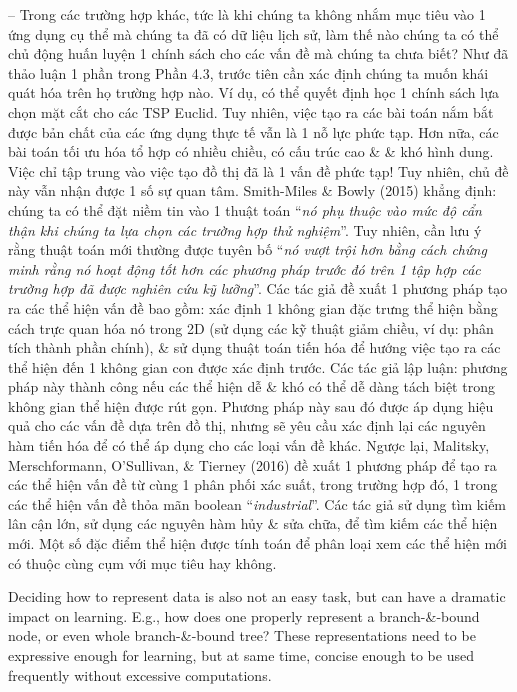 \documentclass{article}
\begin{document}
\begin{itemize}
\begin{itemize}
        -- Trong các trường hợp khác, tức là khi chúng ta không nhắm mục tiêu vào 1 ứng dụng cụ thể mà chúng ta đã có dữ liệu lịch sử, làm thế nào chúng ta có thể chủ động huấn luyện 1 chính sách cho các vấn đề mà chúng ta chưa biết? Như đã thảo luận 1 phần trong Phần 4.3, trước tiên cần xác định chúng ta muốn khái quát hóa trên họ trường hợp nào. Ví dụ, có thể quyết định học 1 chính sách lựa chọn mặt cắt cho các TSP Euclid. Tuy nhiên, việc tạo ra các bài toán nắm bắt được bản chất của các ứng dụng thực tế vẫn là 1 nỗ lực phức tạp. Hơn nữa, các bài toán tối ưu hóa tổ hợp có nhiều chiều, có cấu trúc cao \& \& khó hình dung. Việc chỉ tập trung vào việc tạo đồ thị đã là 1 vấn đề phức tạp! Tuy nhiên, chủ đề này vẫn nhận được 1 số sự quan tâm. Smith-Miles \& Bowly (2015) khẳng định: chúng ta có thể đặt niềm tin vào 1 thuật toán ``{\it nó phụ thuộc vào mức độ cẩn thận khi chúng ta lựa chọn các trường hợp thử nghiệm}''. Tuy nhiên, cần lưu ý rằng thuật toán mới thường được tuyên bố ``{\it nó vượt trội hơn bằng cách chứng minh rằng nó hoạt động tốt hơn các phương pháp trước đó trên 1 tập hợp các trường hợp đã được nghiên cứu kỹ lưỡng}''. Các tác giả đề xuất 1 phương pháp tạo ra các thể hiện vấn đề bao gồm: xác định 1 không gian đặc trưng thể hiện bằng cách trực quan hóa nó trong 2D (sử dụng các kỹ thuật giảm chiều, ví dụ: phân tích thành phần chính), \& sử dụng thuật toán tiến hóa để hướng việc tạo ra các thể hiện đến 1 không gian con được xác định trước. Các tác giả lập luận: phương pháp này thành công nếu các thể hiện dễ \& khó có thể dễ dàng tách biệt trong không gian thể hiện được rút gọn. Phương pháp này sau đó được áp dụng hiệu quả cho các vấn đề dựa trên đồ thị, nhưng sẽ yêu cầu xác định lại các nguyên hàm tiến hóa để có thể áp dụng cho các loại vấn đề khác. Ngược lại, Malitsky, Merschformann, O'Sullivan, \& Tierney (2016) đề xuất 1 phương pháp để tạo ra các thể hiện vấn đề từ cùng 1 phân phối xác suất, trong trường hợp đó, 1 trong các thể hiện vấn đề thỏa mãn boolean ``{\it industrial}''. Các tác giả sử dụng tìm kiếm lân cận lớn, sử dụng các nguyên hàm hủy \& sửa chữa, để tìm kiếm các thể hiện mới. Một số đặc điểm thể hiện được tính toán để phân loại xem các thể hiện mới có thuộc cùng cụm với mục tiêu hay không.

        Deciding how to represent data is also not an easy task, but can have a dramatic impact on learning. E.g., how does one properly represent a branch-\&-bound node, or even whole branch-\&-bound tree? These representations need to be expressive enough for learning, but at same time, concise enough to be used frequently without excessive computations.


\end{itemize}
\end{itemize}
\end{document}
